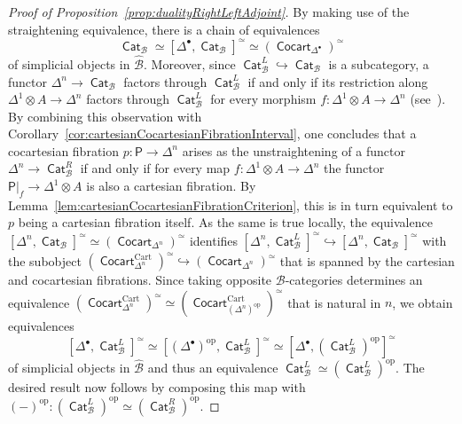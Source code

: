 \documentclass[reqno]{amsart}
\numberwithin{equation}{subsection}
\theoremstyle{plain}
\theoremstyle{definition}
\let\scr=\mathcal
\let\into=\hookrightarrow
\def\BB{\scr B}
\def\BBB{\widehat{\BB}}
\DeclareMathOperator{\ICat}{\mathsf{Cat}}
\DeclareMathOperator{\Cart}{Cart}
\DeclareMathOperator{\ICocart}{\mathsf{Cocart}}
\newcommand{\op}{\mathrm{op}}
\newcommand{\core}{\simeq}
\newcommand{\I}[1]{\mathsf{#1}}
\newcommand{\iFun}[2]{{[#1,#2]}}
\begin{document}
\begin{proof}[{Proof of Proposition~\ref{prop:dualityRightLeftAdjoint}}]
	By making use of the straightening equivalence, there is a chain of equivalences
	\begin{equation*}
		\ICat_{\BB}\simeq \iFun{\Delta^\bullet}{\ICat_{\BB}}^\core\simeq (\ICocart_{\Delta^\bullet})^\core
	\end{equation*}
	of simplicial objects in $\BBB$. Moreover, since $\ICat_{\BB}^L\into \ICat_{\BB}$ is a subcategory, a functor $\Delta^n\to \ICat_{\BB}$ factors through $\ICat_{\BB}^L$ if and only if its restriction along $\Delta^1\otimes A\to \Delta^n$ factors through $\ICat_{\BB}^L$ for every morphism $f\colon \Delta^1\otimes A\to\Delta^n$ (see~\cite[Proposition~2.9.3]{Martini2021a}). By combining this observation with Corollary~\ref{cor:cartesianCocartesianFibrationInterval}, one concludes that a cocartesian fibration $p\colon \I{P}\to\Delta^n$ arises as the unstraightening of a functor $\Delta^n\to\ICat_{\BB}^R$ if and only if for every map $f\colon\Delta^1\otimes A\to\Delta^n$ the functor $\I{P}\vert_f\to\Delta^1\otimes A$ is also a cartesian fibration. By Lemma~\ref{lem:cartesianCocartesianFibrationCriterion}, this is in turn equivalent to $p$ being a cartesian fibration itself. As the same is true locally, the equivalence $\iFun{\Delta^n}{\ICat_{\BB}}^\core\simeq (\ICocart_{\Delta^n})^\core$ identifies $\iFun{\Delta^n}{\ICat_{\BB}^L}^\core\into\iFun{\Delta^n}{\ICat_{\BB}}^\core$ with the subobject $(\ICocart_{\Delta^n}^{\Cart})^\core\into(\ICocart_{\Delta^n})^\core$ that is spanned by the cartesian and cocartesian fibrations. Since taking opposite $\BB$-categories determines an equivalence $(\ICocart_{\Delta^n}^{\Cart})^\core\simeq (\ICocart_{(\Delta^n)^\op}^{\Cart})^\core$ that is natural in $n$, we obtain equivalences
	\begin{equation*}
	\iFun{\Delta^\bullet}{\ICat_{\BB}^L}^\core\simeq \iFun{(\Delta^\bullet)^\op}{\ICat_{\BB}^L}^\core\simeq\iFun{\Delta^\bullet}{(\ICat_{\BB}^L)^\op}^\core
	\end{equation*}
	of simplicial objects in $\BBB$ and thus an equivalence $\ICat_{\BB}^L\simeq(\ICat_{\BB}^L)^{\op}$. The desired result now follows by composing this map with $(-)^\op\colon(\ICat_{\BB}^L)^\op\simeq(\ICat_{\BB}^R)^\op$.
\end{proof}

\appendix
\end{document}
